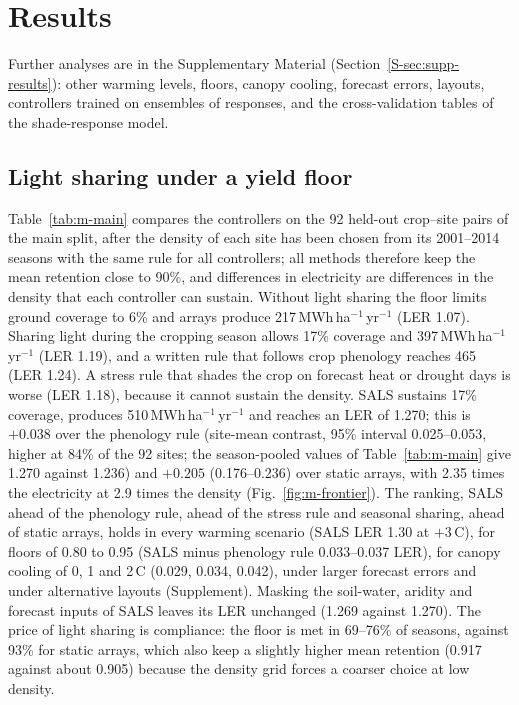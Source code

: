 \section{Results}\label{sec:results}
Further analyses are in the Supplementary Material (Section~\ref{S-sec:supp-results}): other warming levels, floors, canopy cooling, forecast errors, layouts, controllers trained on ensembles of responses, and the cross-validation tables of the shade-response model.

\subsection{Light sharing under a yield floor}\label{sec:r-main}
Table~\ref{tab:m-main} compares the controllers on the 92 held-out crop--site pairs of the main split, after the density of each site has been chosen from its 2001--2014 seasons with the same rule for all controllers; all methods therefore keep the mean retention close to 90\%, and differences in electricity are differences in the density that each controller can sustain. Without light sharing the floor limits ground coverage to 6\% and arrays produce 217\,MWh\,ha$^{-1}$\,yr$^{-1}$ (LER 1.07). Sharing light during the cropping season allows 17\% coverage and 397\,MWh\,ha$^{-1}$\,yr$^{-1}$ (LER 1.19), and a written rule that follows crop phenology reaches 465 (LER 1.24). A stress rule that shades the crop on forecast heat or drought days is worse (LER 1.18), because it cannot sustain the density. SALS sustains 17\% coverage, produces 510\,MWh\,ha$^{-1}$\,yr$^{-1}$ and reaches an LER of 1.270; this is $+0.038$ over the phenology rule (site-mean contrast, 95\% interval 0.025--0.053, higher at 84\% of the 92 sites; the season-pooled values of Table~\ref{tab:m-main} give 1.270 against 1.236) and $+0.205$ (0.176--0.236) over static arrays, with 2.35 times the electricity at 2.9 times the density (Fig.~\ref{fig:m-frontier}). The ranking, SALS ahead of the phenology rule, ahead of the stress rule and seasonal sharing, ahead of static arrays, holds in every warming scenario (SALS LER 1.30 at $+3$\,\textdegree C), for floors of 0.80 to 0.95 (SALS minus phenology rule 0.033--0.037 LER), for canopy cooling of 0, 1 and 2\,\textdegree C (0.029, 0.034, 0.042), under larger forecast errors and under alternative layouts (Supplement). Masking the soil-water, aridity and forecast inputs of SALS leaves its LER unchanged (1.269 against 1.270). The price of light sharing is compliance: the floor is met in 69--76\% of seasons, against 93\% for static arrays, which also keep a slightly higher mean retention (0.917 against about 0.905) because the density grid forces a coarser choice at low density.

